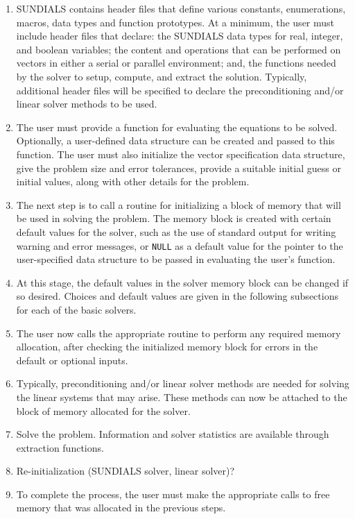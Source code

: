 \begin{enumerate}

\item \label{sun_headers}
SUNDIALS contains header files that define various constants,
enumerations, macros, data types and function prototypes.  At a
minimum, the user must include header files that declare: the SUNDIALS
data types for real, integer, and boolean variables; the content and
operations that can be performed on vectors in either a serial or
parallel environment; and, the functions needed by the solver to
setup, compute, and extract the solution. Typically, additional header
files will be specified to declare the preconditioning and/or linear
solver methods to be used.

\item \label{sun_problem}
The user must provide a function for evaluating the equations to be
solved. Optionally, a user-defined data structure can be created and
passed to this function. The user must also initialize the vector
specification data structure, give the problem size and error
tolerances, provide a suitable initial guess or initial values, along
with other details for the problem.

\item \label{sun_create}
The next step is to call a routine for initializing a block of memory
that will be used in solving the problem. The memory block is created
with certain default values for the solver, such as the use of
standard output for writing warning and error messages, or {\tt NULL}
as a default value for the pointer to the user-specified data
structure to be passed in evaluating the user's function.

\item \label{sun_set}
At this stage, the default values in the solver memory block can be
changed if so desired. Choices and default values are given in the
following subsections for each of the basic solvers.

\item \label{sun_malloc}
The user now calls the appropriate routine to perform any required
memory allocation, after checking the initialized memory block for
errors in the default or optional inputs.

\item \label{sun_linear}
Typically, preconditioning and/or linear solver methods are needed for
solving the linear systems that may arise. These methods can now be
attached to the block of memory allocated for the solver.

\item \label{sun_solve}
Solve the problem. Information and solver statistics are available
through extraction functions.

\item \label{sun_reinit}
Re-initialization (SUNDIALS solver, linear solver)?

\item \label{sun_finalize}
To complete the process, the user must make the appropriate calls to
free memory that was allocated in the previous steps.

\end{enumerate}


